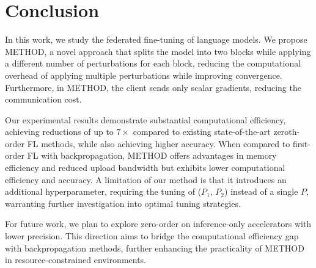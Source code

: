 \section{Conclusion}
In this work, we study the federated fine-tuning of language models. We propose \ac{METHOD}, a novel approach that splits the model into two blocks while applying a different number of perturbations for each block, reducing the computational overhead of applying multiple perturbations while improving convergence. Furthermore, in \ac{METHOD}, the client sends only scalar gradients, reducing the communication cost. 

Our experimental results demonstrate substantial computational efficiency, achieving reductions of up to $7\times$ compared to existing state-of-the-art zeroth-order \ac{FL} methods, while also achieving higher accuracy. When compared to first-order \ac{FL} with backpropagation, \ac{METHOD} offers advantages in memory efficiency and reduced upload bandwidth but exhibits lower computational efficiency and accuracy. A limitation of our method is that it introduces an additional hyperparameter, requiring the tuning of ($P_{1}$, $P_{2}$) instead of a single $P$, warranting further investigation into optimal tuning strategies.

For future work, we plan to explore zero-order on inference-only accelerators with lower precision. This direction aims to bridge the computational efficiency gap with backpropagation methods, further enhancing the practicality of \ac{METHOD} in resource-constrained environments.
